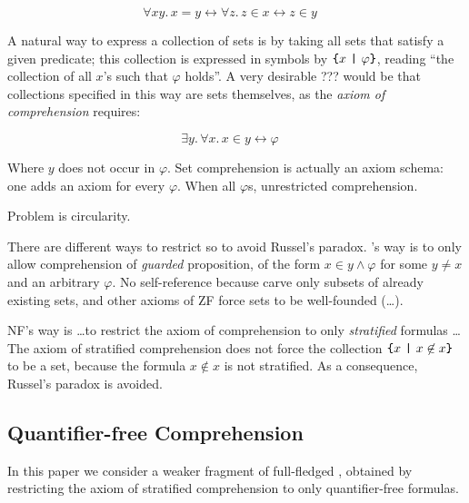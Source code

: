 \documentclass[sigplan,10pt,anonymous,review]{acmart}\settopmatter{printfolios=true,printccs=false,printacmref=false}
\begin{document}
\[\forall x y.\, x = y \leftrightarrow \forall z. \, z \in x \leftrightarrow z \in y \quad \tag{\SetExt} \]

A natural way to express a collection of sets is by taking all sets that satisfy a given predicate; this collection is expressed in symbols by $\text{\texttt{\{}} x ~\text{\texttt{|}}~ \varphi \text{\texttt{\}}}$, reading ``the collection of all $x$'s such that $\varphi$ holds''.  A very desirable ??? would be that collections specified in this way are sets themselves, as the \emph{axiom of comprehension} requires:

\[ \exists y.\, \forall x.\, x \in y \leftrightarrow \varphi  \quad \tag{\SetCompr} \]


Where $y$ does not occur in $\varphi$. 
Set comprehension is actually an axiom schema: one adds an axiom for every $\varphi$. 
When all $\varphi$s, unrestricted comprehension. 


Problem is circularity.

There are different ways to restrict \SetCompr{} so to avoid Russel's paradox. \ZF's way is to only allow comprehension of \emph{guarded} proposition, of the form $x \in y \land \varphi$ for some $y\neq x$ and an arbitrary $\varphi$.  No self-reference because carve only subsets of already existing sets, and other axioms of ZF force sets to be well-founded (\dots).

NF's way is \dots to restrict the axiom of comprehension to only \emph{stratified} formulas \ldots
The axiom of stratified comprehension does not force the collection $\text{\texttt{\{}} x ~\text{\texttt{|}}~ x \not\in x \text{\texttt{\}}}$ to be a set, because the formula $x \not\in x$ is not stratified. As a consequence, Russel's paradox is avoided.

\subsection{Quantifier-free Comprehension}

In this paper we consider a weaker fragment of full-fledged \NF{}, obtained by restricting the axiom of stratified comprehension to only quantifier-free formulas.
\end{document}
